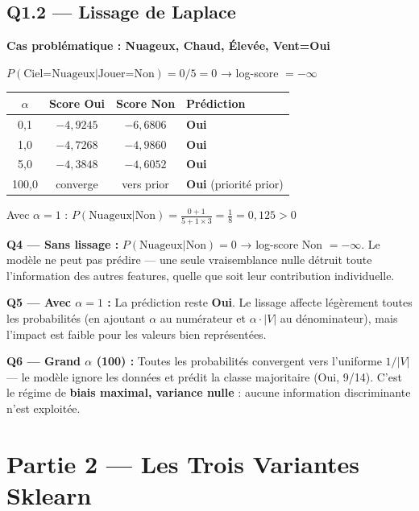 \documentclass[12pt,a4paper]{article}
\begin{document}
\subsection{Q1.2 — Lissage de Laplace}

\begin{resultbox}
\textbf{Cas problématique : Nuageux, Chaud, Élevée, Vent=Oui}

$P(\text{Ciel=Nuageux} | \text{Jouer=Non}) = 0/5 = 0$ → log-score $= -\infty$
\begin{center}
\begin{tabular}{cccl}
\toprule
$\alpha$ & Score Oui & Score Non & Prédiction \\
\midrule
0{,}1 & $-4{,}9245$ & $-6{,}6806$ & \textbf{Oui} \\
1{,}0 & $-4{,}7268$ & $-4{,}9860$ & \textbf{Oui} \\
5{,}0 & $-4{,}3848$ & $-4{,}6052$ & \textbf{Oui} \\
100{,}0 & converge & vers prior & \textbf{Oui} (priorité prior) \\
\bottomrule
\end{tabular}
\end{center}
Avec $\alpha=1$ : $P(\text{Nuageux}|\text{Non}) = \frac{0+1}{5+1\times3} = \frac{1}{8} = 0{,}125 > 0$
\end{resultbox}

\begin{reponsebox}
\textbf{Q4 — Sans lissage :} $P(\text{Nuageux}|\text{Non})=0$ → log-score Non $= -\infty$. Le modèle ne peut pas prédire — une seule vraisemblance nulle détruit toute l'information des autres features, quelle que soit leur contribution individuelle.

\textbf{Q5 — Avec $\alpha=1$ :} La prédiction reste \textbf{Oui}. Le lissage affecte légèrement toutes les probabilités (en ajoutant $\alpha$ au numérateur et $\alpha\cdot|V|$ au dénominateur), mais l'impact est faible pour les valeurs bien représentées.

\textbf{Q6 — Grand $\alpha$ (100) :} Toutes les probabilités convergent vers l'uniforme $1/|V|$ — le modèle ignore les données et prédit la classe majoritaire (Oui, 9/14). C'est le régime de \textbf{biais maximal, variance nulle} : aucune information discriminante n'est exploitée.
\end{reponsebox}

\section{Partie 2 — Les Trois Variantes Sklearn}
\end{document}
